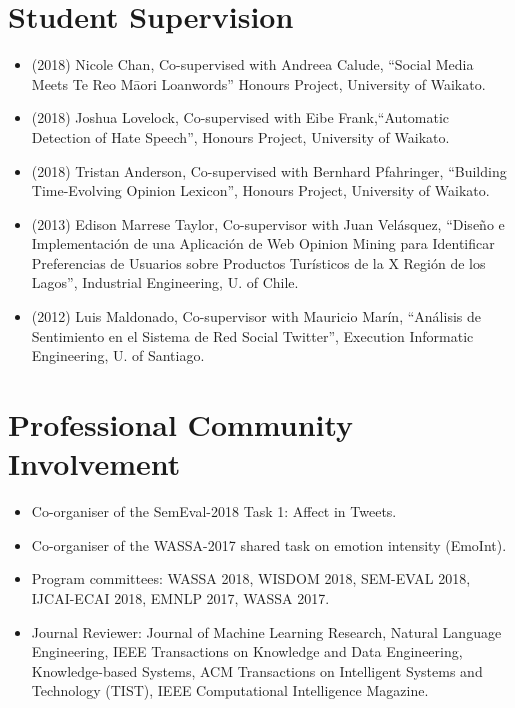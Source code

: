 \documentclass[letterpaper]{article}
\begin{document}
\section{Student Supervision}
\begin{itemize}

\item (2018) Nicole Chan, Co-supervised with Andreea Calude, ``Social Media Meets Te Reo Māori Loanwords''  Honours Project, University of Waikato. 

\item  (2018)  Joshua Lovelock, Co-supervised with Eibe Frank,``Automatic Detection of Hate Speech'', Honours Project, University of Waikato.

\item  (2018) Tristan Anderson, Co-supervised with Bernhard Pfahringer, ``Building Time-Evolving Opinion Lexicon'', Honours Project, University of Waikato.

 \item (2013) Edison Marrese Taylor, Co-supervisor with Juan Velásquez, ``Diseño e Implementación de una Aplicación de Web Opinion Mining para Identificar Preferencias de Usuarios sobre Productos Turísticos de la X Región de los Lagos'', Industrial Engineering, U. of Chile.

 \item (2012) Luis Maldonado, Co-supervisor with Mauricio Marín, ``Análisis de Sentimiento en el Sistema de Red Social Twitter'', Execution Informatic Engineering, U. of Santiago.

\end{itemize}


\section{Professional Community Involvement}
\begin{itemize}
  \item Co-organiser of the SemEval-2018 Task 1: Affect in Tweets.
  \item Co-organiser of the WASSA-2017 shared task on emotion intensity (EmoInt).
  \item Program committees: WASSA 2018, WISDOM 2018, SEM-EVAL 2018, IJCAI-ECAI 2018, EMNLP 2017, WASSA 2017.
  \item Journal Reviewer:  Journal of Machine Learning Research, Natural Language Engineering, IEEE Transactions on Knowledge and Data Engineering, Knowledge-based Systems, ACM Transactions on Intelligent Systems and Technology (TIST), IEEE Computational Intelligence Magazine.
  \end{itemize}
\end{document}
